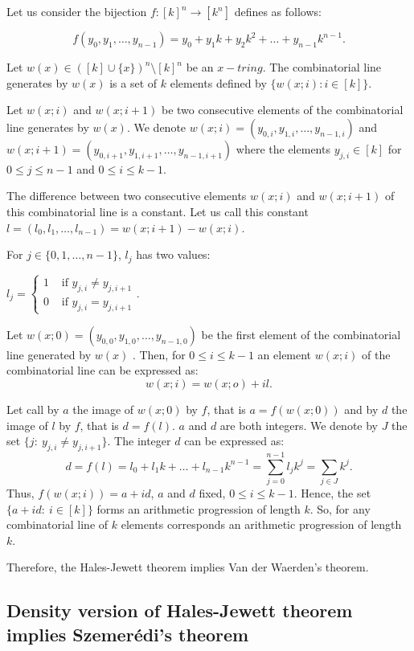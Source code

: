 Let us consider the bijection $f:[k]^n \longrightarrow [k^n]$ defines as follows:

$$f(y_0,y_1,\ldots, y_{n-1})=y_0+y_1k+y_2 k^2+\ldots+y_{n-1}k^{n-1}.$$

Let $w(x) \in ([k] \cup \{x\})^n\setminus [k]^n$ be an $x-tring.$ The combinatorial line generates by $w(x)$ is a set of $k$ elements defined by  $\{w(x;i):i\in [k]\}.$

Let $w(x;i)$ and $w(x;i+1)$ be two consecutive elements of the combinatorial line generates by $w(x)$. We denote  $w(x;i)=(y_{0,i},y_{1,i},\ldots, y_{n-1,i}) $ and $w(x;i+1)=(y_{0,i+1},y_{1,i+1},\ldots, y_{n-1,i+1})$ where  the elements  $y_{j,i} \in [k]$ for $0 \leq j \leq n-1$ and $0 \leq i \leq k-1.$

The difference between two consecutive elements $w(x;i)$ and $w(x;i+1)$ of this combinatorial line is a constant. Let us call this constant $l=(l_0, l_1, \ldots, l_{n-1})= w(x;i+1)-w(x;i)$.


For $j\in \{0,1,\ldots, n-1\}$, $l_j$ has two values:

$l_j= \left\lbrace \begin{array}{ll}1 & \text{ if } y_{j,i}\neq y_{j,i+1} \\ 0 & \text{ if } y_{j,i} =  y_{j,i+1}   \end{array} \right. .$

Let $w(x;0)=(y_{0,0},y_{1,0},\ldots, y_{n-1,0})$ be the first element of the combinatorial line generated by $w(x)$ . Then, for $0\leq i \leq k-1$ an element $w(x;i)$ of the combinatorial line can be expressed as: $$w(x;i)=w(x;o)+il.$$

Let call by $a$ the image of $w(x;0)$ by $f$, that is $a=f(w(x;0))$ and by $d$ the image of $l$ by $f$, that is $d=f(l).$ $a$ and $d$ are both integers.  We denote by $J$ the set $\{j: \ y_{j,i}\neq y_{j,i+1} \}.$ The integer $d$ can be expressed as:
$$d=f(l)=l_0+l_1k+\ldots+l_{n-1}k^{n-1}=\sum_{j=0}^{n-1}l_jk^j= \sum_{j\in J} k^j.$$
Thus, $f(w(x;i))=a+id$, $a$ and $d$ fixed, $0\leq i \leq k-1$. Hence, the set $\{a+id: \ i\in [k]\}$ forms an arithmetic progression of length $k.$ So, for any combinatorial line of $k$ elements corresponds an arithmetic progression of length $k.$

Therefore, the Hales-Jewett theorem implies Van der Waerden's theorem.

\subsection{Density version of Hales-Jewett theorem implies Szemerédi's theorem}

